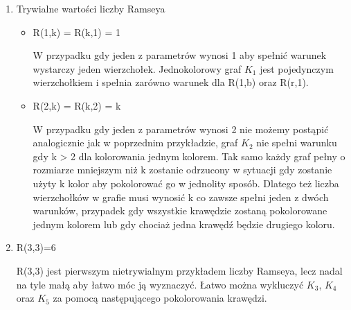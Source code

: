 \documentclass[11pt]{article}
\begin{document}
\begin{enumerate}
  \item Trywialne wartości liczby Ramseya \hfill 
  
  \begin{itemize}
  \item R(1,k) = R(k,1) = 1 \hfill \par
  W przypadku gdy jeden z parametrów wynosi 1 aby spełnić warunek wystarczy jeden wierzchołek.  Jednokolorowy graf $\mathit{K}_{1}$ jest pojedynczym wierzchołkiem i spełnia zarówno warunek dla R(1,b) oraz R(r,1). 
  
   \item R(2,k) = R(k,2) = k \hfill  \par
	W przypadku gdy jeden z parametrów wynosi 2 nie możemy postąpić analogicznie jak w poprzednim przykładzie, graf $\mathit{K}_{2}$ nie spełni warunku gdy k > 2 dla kolorowania jednym kolorem. Tak samo każdy graf pełny o rozmiarze mniejszym niż k zostanie odrzucony w sytuacji gdy zostanie użyty k kolor aby pokolorować go w jednolity sposób. Dlatego też liczba wierzchołków w grafie musi wynosić k co zawsze spełni jeden z dwóch warunków, przypadek gdy wszystkie krawędzie zostaną pokolorowane jednym kolorem lub gdy chociaż jedna krawędź będzie drugiego koloru.
  	
  \end{itemize}

  
 
  \item R(3,3)=6 \hfill \par
  R(3,3) jest pierwszym nietrywialnym przykładem liczby Ramseya, lecz nadal na tyle małą aby łatwo móc ją wyznaczyć. Łatwo można wykluczyć $\mathit{K}_{3}$, $\mathit{K}_{4}$ oraz $\mathit{K}_{5}$ za pomocą następującego pokolorowania krawędzi.


\begin{figure}[h]
  \centering
    \caption{}
 \end{figure}


\end{enumerate}
\end{document}
